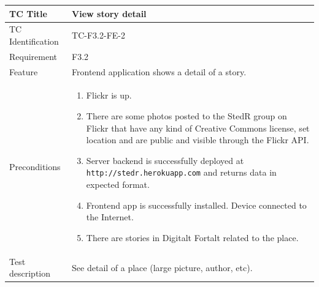 \documentclass[11pt]{book}
\begin{document}
\begin{table}
  \begin{tabular}{| p{3cm} | p{9.5cm} |} \hline 
    TC Title              & View story detail \\ \hline 
    TC Identification     & TC-F3.2-FE-2 \\ \hline 
    Requirement           & F3.2 \\ \hline 
    Feature               & Frontend application shows a detail of a story. \\ \hline 
    Preconditions         & \begin{enumerate}
                              \item Flickr is up.
                              \item There are some photos posted to the StedR group on Flickr that have any kind of
                               Creative Commons license, set location and are public and visible through the Flickr API.
                              \item Server backend is successfully deployed at \texttt{http://stedr.herokuapp.com} and returns data in expected format.
                              \item Frontend app is successfully installed. Device connected to the Internet.
                              \item There are stories in Digitalt Fortalt related to the place.
                            \end{enumerate} \\ \hline 

    Test description      & See detail of a place (large picture, author, etc).


\end{tabular}
\end{table}
\end{document}
